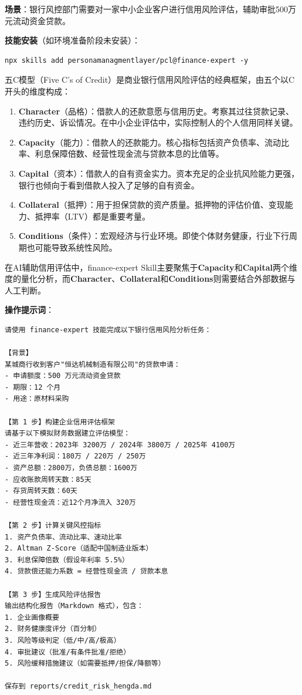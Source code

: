 \textbf{场景}：银行风控部门需要对一家中小企业客户进行信用风险评估，辅助审批500万元流动资金贷款。

\textbf{技能安装}（如环境准备阶段未安装）：

\begin{lstlisting}[style=shell]
npx skills add personamanagmentlayer/pcl@finance-expert -y
\end{lstlisting}

\begin{theorybox}[信用风险评估的五C模型]
五C模型（Five C's of Credit）是商业银行信用风险评估的经典框架，由五个以C开头的维度构成：

\begin{enumerate}[leftmargin=1em]
  \item \textbf{Character}（品格）：借款人的还款意愿与信用历史。考察其过往贷款记录、违约历史、诉讼情况。在中小企业评估中，实际控制人的个人信用同样关键。
  \item \textbf{Capacity}（能力）：借款人的还款能力。核心指标包括资产负债率、流动比率、利息保障倍数、经营性现金流与贷款本息的比值等。
  \item \textbf{Capital}（资本）：借款人的自有资金实力。资本充足的企业抗风险能力更强，银行也倾向于看到借款人投入了足够的自有资金。
  \item \textbf{Collateral}（抵押）：用于担保贷款的资产质量。抵押物的评估价值、变现能力、抵押率（LTV）都是重要考量。
  \item \textbf{Conditions}（条件）：宏观经济与行业环境。即使个体财务健康，行业下行周期也可能导致系统性风险。
\end{enumerate}

在AI辅助信用评估中，finance-expert Skill主要聚焦于\textbf{Capacity}和\textbf{Capital}两个维度的量化分析，而\textbf{Character}、\textbf{Collateral}和\textbf{Conditions}则需要结合外部数据与人工判断。
\end{theorybox}

\textbf{操作提示词}：

\begin{lstlisting}
请使用 finance-expert 技能完成以下银行信用风险分析任务：

【背景】
某城商行收到客户"恒达机械制造有限公司"的贷款申请：
- 申请额度：500 万元流动资金贷款
- 期限：12 个月
- 用途：原材料采购

【第 1 步】构建企业信用评估框架
请基于以下模拟财务数据建立评估模型：
- 近三年营收：2023年 3200万 / 2024年 3800万 / 2025年 4100万
- 近三年净利润：180万 / 220万 / 250万
- 资产总额：2800万，负债总额：1600万
- 应收账款周转天数：85天
- 存货周转天数：60天
- 经营性现金流：近12个月净流入 320万

【第 2 步】计算关键风控指标
1. 资产负债率、流动比率、速动比率
2. Altman Z-Score（适配中国制造业版本）
3. 利息保障倍数（假设年利率 5.5%）
4. 贷款偿还能力系数 = 经营性现金流 / 贷款本息

【第 3 步】生成风险评估报告
输出结构化报告（Markdown 格式），包含：
1. 企业画像概要
2. 财务健康度评分（百分制）
3. 风险等级判定（低/中/高/极高）
4. 审批建议（批准/有条件批准/拒绝）
5. 风险缓释措施建议（如需要抵押/担保/降额等）

保存到 reports/credit_risk_hengda.md
\end{lstlisting}

